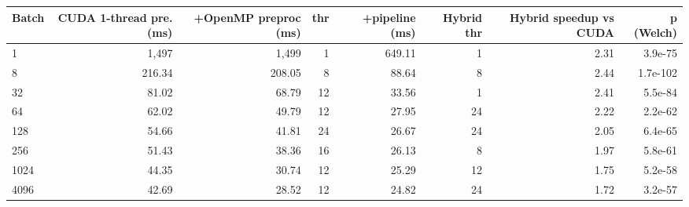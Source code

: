 \begin{tabular}{lrrrrrrr}
\toprule
Batch & CUDA 1-thread pre. (ms) & +OpenMP preproc (ms) & thr & +pipeline (ms) & Hybrid thr & Hybrid speedup vs CUDA & p (Welch) \\
\midrule
1 & 1,497 & 1,499 & 1 & 649.11 & 1 & 2.31 & 3.9e-75 \\
8 & 216.34 & 208.05 & 8 & 88.64 & 8 & 2.44 & 1.7e-102 \\
32 & 81.02 & 68.79 & 12 & 33.56 & 1 & 2.41 & 5.5e-84 \\
64 & 62.02 & 49.79 & 12 & 27.95 & 24 & 2.22 & 2.2e-62 \\
128 & 54.66 & 41.81 & 24 & 26.67 & 24 & 2.05 & 6.4e-65 \\
256 & 51.43 & 38.36 & 16 & 26.13 & 8 & 1.97 & 5.8e-61 \\
1024 & 44.35 & 30.74 & 12 & 25.29 & 12 & 1.75 & 5.2e-58 \\
4096 & 42.69 & 28.52 & 12 & 24.82 & 24 & 1.72 & 3.2e-57 \\
\bottomrule
\end{tabular}
